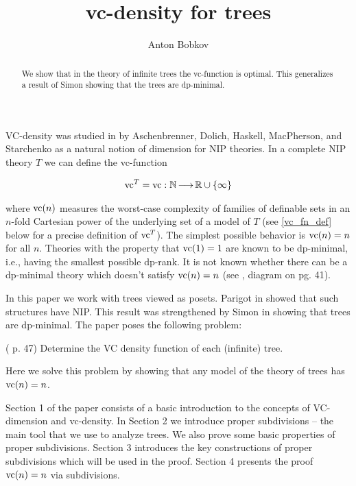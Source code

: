 \documentclass{amsart}
\newcommand{\curly}[1]{\left\{#1\right\}}
\begin{document}
\title{vc-density for trees}
\author{Anton Bobkov}

\begin{abstract}
  We show that in the theory of infinite trees the vc-function is optimal.
  This generalizes a result of Simon showing that the trees are dp-minimal. 
\end{abstract}

\maketitle

VC-density was studied in \cite{density} by Aschenbrenner, Dolich, Haskell, MacPherson, and Starchenko as a natural notion of dimension for NIP theories.
In a complete NIP theory $T$ we can define the vc-function

\begin{align*}
  \vc^T = \vc : \N \arr \R \cup \curly{\infty}
\end{align*}

where $\operatorname{vc}(n)$ measures the worst-case complexity of families of definable sets in an $n$-fold Cartesian power of the underlying set of a model of $T$
(see \ref{vc_fn_def} below for a precise definition of $\operatorname{vc}^T$).
The simplest possible behavior is $\operatorname{vc}(n) = n$ for all $n$. Theories with the property that $\operatorname{vc}(1) = 1$ are known to be dp-minimal, i.e., having the smallest possible dp-rank. It is not known whether there can be a dp-minimal theory which doesn't satisfy $\operatorname{vc}(n)=n$
(see \cite{density}, diagram on pg. 41).

In this paper we work with trees viewed as posets.
Parigot in \cite{parigot_trees} showed that such structures have NIP.
This result was strengthened by Simon in \cite{simon_dp_min} showing that trees are dp-minimal.
The paper \cite{density} poses the following problem:

\begin{Problem} (\cite{density} p. 47)
  Determine the VC density function of each (infinite) tree.
\end{Problem}

Here we solve this problem by showing that any model of the theory of trees has $\operatorname{vc}(n) = n$.

Section 1 of the paper consists of a basic introduction to the concepts of VC-dimension and vc-density.
In Section 2 we introduce proper subdivisions -- the main tool that we use to analyze trees.
We also prove some basic properties of proper subdivisions.
Section 3 introduces the key constructions of proper subdivisions which will be used in the proof.
Section 4 presents the proof $\operatorname{vc}(n) = n$ via subdivisions.
\end{document}
